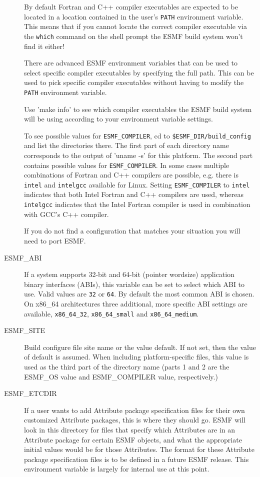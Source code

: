 \begin{description}
By default Fortran and C++ compiler executables are expected to be located in
a location contained in the user's {\tt PATH} environment variable. This means
that if you cannot locate the correct compiler executable via the {\tt which}
command on the shell prompt the ESMF build system won't find it either!

There are advanced ESMF environment variables that can be used to select 
specific compiler executables by specifying the full path. This can be used to
pick specific compiler executables without having to modify the {\tt PATH}
environment variable.

Use 'make info' to see which compiler executables the ESMF build system will
be using according to your environment variable settings.

To see possible values for {\tt ESMF\_COMPILER}, cd to 
{\tt \$ESMF\_DIR/build\_config} and list the directories there. The first part 
of each directory name corresponds to the output of 'uname -s' for this 
platform. The second part contains possible values for {\tt ESMF\_COMPILER}. In
some cases multiple combinations of Fortran and C++ compilers are possible, e.g.
there is {\tt intel} and {\tt intelgcc} available for Linux. Setting 
{\tt ESMF\_COMPILER} to {\tt intel} indicates that both Intel Fortran and 
C++ compilers are used, whereas {\tt intelgcc} indicates that the Intel Fortran
compiler is used in combination with GCC's C++ compiler.

If you do not find a configuration that matches your situation you will need to
port ESMF.

\item[ESMF\_ABI]
If a system supports 32-bit and 64-bit (pointer wordsize) application binary
interfaces (ABIs), this variable can be set to select which ABI to use. Valid 
values are {\tt 32} or {\tt 64}. By default the most common ABI is chosen. On
x86\_64 architectures three additional, more specific ABI settings are available,
{\tt x86\_64\_32}, {\tt x86\_64\_small} and {\tt x86\_64\_medium}.

\item[ESMF\_SITE]
Build configure file site name or the value default. If not set, then the value
of default is assumed. When including platform-specific files, this value is
used as the third part of the directory name (parts 1 and 2 are the
ESMF\_OS value and ESMF\_COMPILER value, respectively.)

\item[ESMF\_ETCDIR]
If a user wants to add Attribute package specification files for their own 
customized Attribute packages, this is where they should go.  ESMF will look in 
this directory for files that specify which Attributes are in an Attribute 
package for certain ESMF objects, and what the appropriate initial values would 
be for those Attributes.  The format for these Attribute package specification 
files is to be defined in a future ESMF release.  This environment variable is 
largely for internal use at this point. 


\end{description}
